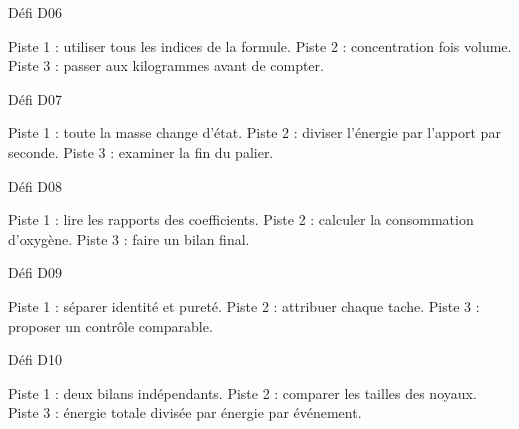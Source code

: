 \par\addvspace{3mm}\noindent\begin{minipage}{\linewidth}
{\otSemi\color{otNavy}Défi D06}\label{indice-6}\par\vspace{1mm}
Piste 1 : utiliser tous les indices de la formule. Piste 2 : concentration fois volume. Piste 3 : passer aux kilogrammes avant de compter.
\end{minipage}\par

\par\addvspace{3mm}\noindent\begin{minipage}{\linewidth}
{\otSemi\color{otNavy}Défi D07}\label{indice-7}\par\vspace{1mm}
Piste 1 : toute la masse change d’état. Piste 2 : diviser l’énergie par l’apport par seconde. Piste 3 : examiner la fin du palier.
\end{minipage}\par

\par\addvspace{3mm}\noindent\begin{minipage}{\linewidth}
{\otSemi\color{otNavy}Défi D08}\label{indice-8}\par\vspace{1mm}
Piste 1 : lire les rapports des coefficients. Piste 2 : calculer la consommation d’oxygène. Piste 3 : faire un bilan final.
\end{minipage}\par

\par\addvspace{3mm}\noindent\begin{minipage}{\linewidth}
{\otSemi\color{otNavy}Défi D09}\label{indice-9}\par\vspace{1mm}
Piste 1 : séparer identité et pureté. Piste 2 : attribuer chaque tache. Piste 3 : proposer un contrôle comparable.
\end{minipage}\par

\par\addvspace{3mm}\noindent\begin{minipage}{\linewidth}
{\otSemi\color{otNavy}Défi D10}\label{indice-10}\par\vspace{1mm}
Piste 1 : deux bilans indépendants. Piste 2 : comparer les tailles des noyaux. Piste 3 : énergie totale divisée par énergie par événement.
\end{minipage}\par

